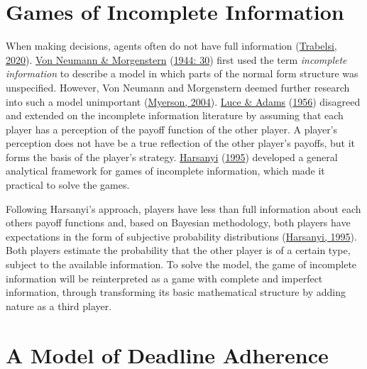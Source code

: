 \documentclass[11pt,preprint, authoryear]{elsarticle}
\numberwithin{equation}{section}
\numberwithin{figure}{section}
\numberwithin{table}{section}
\begin{document}
\hypertarget{games-of-incomplete-information}{%
\section{\texorpdfstring{Games of Incomplete Information
\label{lit}}{Games of Incomplete Information }}\label{games-of-incomplete-information}}

When making decisions, agents often do not have full information
(\protect\hyperlink{ref-2020games}{Trabelsi, 2020}).
\protect\hyperlink{ref-von}{Von Neumann \& Morgenstern}
(\protect\hyperlink{ref-von}{1944: 30}) first used the term
\emph{incomplete information} to describe a model in which parts of the
normal form structure was unspecified. However, Von Neumann and
Morgenstern deemed further research into such a model unimportant
(\protect\hyperlink{ref-2004com}{Myerson, 2004}).
\protect\hyperlink{ref-luce1956}{Luce \& Adams}
(\protect\hyperlink{ref-luce1956}{1956}) disagreed and extended on the
incomplete information literature by assuming that each player has a
perception of the payoff function of the other player. A player's
perception does not have be a true reflection of the other player's
payoffs, but it forms the basis of the player's strategy.
\protect\hyperlink{ref-harsanyi}{Harsanyi}
(\protect\hyperlink{ref-harsanyi}{1995}) developed a general analytical
framework for games of incomplete information, which made it practical
to solve the games.

Following Harsanyi's approach, players have less than full information
about each others payoff functions and, based on Bayesian methodology,
both players have expectations in the form of subjective probability
distributions (\protect\hyperlink{ref-harsanyi}{Harsanyi, 1995}). Both
players estimate the probability that the other player is of a certain
type, subject to the available information. To solve the model, the game
of incomplete information will be reinterpreted as a game with complete
and imperfect information, through transforming its basic mathematical
structure by adding nature as a third player.

\hypertarget{a-model-of-deadline-adherence}{%
\section{\texorpdfstring{A Model of Deadline Adherence
\label{game}}{A Model of Deadline Adherence }}\label{a-model-of-deadline-adherence}}
\end{document}
